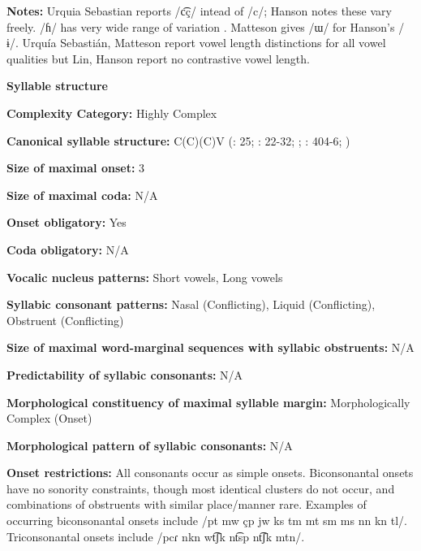 \textbf{Notes:} Urquia Sebastian reports /c͡ç/ intead of /c/; Hanson notes these vary freely. /ɦ/ has very wide range of variation \citep[20-23]{Hanson2010}. Matteson gives /ɯ/ for Hanson’s /ɨ/. Urquía Sebastián, Matteson report vowel length distinctions for all vowel qualities but Lin, Hanson report no contrastive vowel length.



\textbf{Syllable structure}



\textbf{Complexity Category:} Highly Complex



\textbf{Canonical syllable structure:} C(C)(C)V (\citealt{Hanson2010}: 25; \citealt{Matteson1965}: 22-32; \citealt{MattesonPike1958}; \citealt{Lin1997}: 404-6; \citealt{Lin1993})



\textbf{Size of maximal onset:} 3



\textbf{Size of maximal coda:} N/A



\textbf{Onset obligatory:} Yes



\textbf{Coda obligatory:} N/A



\textbf{Vocalic nucleus patterns:} Short vowels, Long vowels



\textbf{Syllabic consonant patterns:} Nasal (Conflicting), Liquid (Conflicting), Obstruent (Conflicting)



\textbf{Size of maximal word{}-marginal sequences with syllabic obstruents:} N/A



\textbf{Predictability of syllabic consonants:} N/A



\textbf{Morphological constituency of maximal syllable margin:} Morphologically Complex (Onset)



\textbf{Morphological pattern of syllabic consonants:} N/A



\textbf{Onset restrictions:} All consonants occur as simple onsets. Biconsonantal onsets have no sonority constraints, though most identical clusters do not occur, and combinations of obstruents with similar place/manner rare. Examples of occurring biconsonantal onsets include /pt mw çp jw ks tm mt sm ms nn kn tl/. Triconsonantal onsets include /pcɾ nkn wt͡ʃk nt͡sp nt͡ʃk mtn/.



